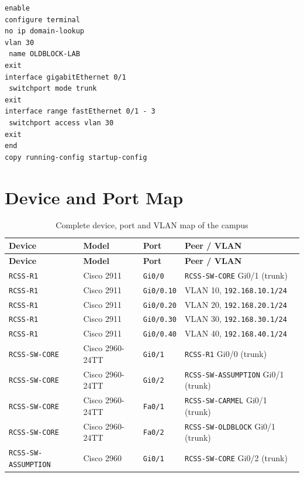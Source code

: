 \documentclass[11pt,a4paper]{article}
\begin{document}
\begin{lstlisting}[caption={Old Block switch \texttt{RCSS-SW-OLDBLOCK}}]
enable
configure terminal
no ip domain-lookup
vlan 30
 name OLDBLOCK-LAB
exit
interface gigabitEthernet 0/1
 switchport mode trunk
exit
interface range fastEthernet 0/1 - 3
 switchport access vlan 30
exit
end
copy running-config startup-config
\end{lstlisting}

\section{Device and Port Map}
\label{app:map}

\small
\begin{longtable}{@{}L{0.24\textwidth} L{0.15\textwidth} L{0.22\textwidth} L{0.29\textwidth}@{}}
\caption{Complete device, port and VLAN map of the campus}\label{tab:map}\\
\toprule
\textbf{Device} & \textbf{Model} & \textbf{Port} & \textbf{Peer / VLAN} \\
\midrule
\endfirsthead
\toprule
\textbf{Device} & \textbf{Model} & \textbf{Port} & \textbf{Peer / VLAN} \\
\midrule
\endhead
\texttt{RCSS-R1}           & Cisco 2911     & \texttt{Gi0/0}    & \texttt{RCSS-SW-CORE} Gi0/1 (trunk) \\
\texttt{RCSS-R1}           & Cisco 2911     & \texttt{Gi0/0.10} & VLAN 10, \texttt{192.168.10.1/24} \\
\texttt{RCSS-R1}           & Cisco 2911     & \texttt{Gi0/0.20} & VLAN 20, \texttt{192.168.20.1/24} \\
\texttt{RCSS-R1}           & Cisco 2911     & \texttt{Gi0/0.30} & VLAN 30, \texttt{192.168.30.1/24} \\
\texttt{RCSS-R1}           & Cisco 2911     & \texttt{Gi0/0.40} & VLAN 40, \texttt{192.168.40.1/24} \\
\texttt{RCSS-SW-CORE}      & Cisco 2960-24TT & \texttt{Gi0/1}    & \texttt{RCSS-R1} Gi0/0 (trunk) \\
\texttt{RCSS-SW-CORE}      & Cisco 2960-24TT & \texttt{Gi0/2}    & \texttt{RCSS-SW-ASSUMPTION} Gi0/1 (trunk) \\
\texttt{RCSS-SW-CORE}      & Cisco 2960-24TT & \texttt{Fa0/1}    & \texttt{RCSS-SW-CARMEL} Gi0/1 (trunk) \\
\texttt{RCSS-SW-CORE}      & Cisco 2960-24TT & \texttt{Fa0/2}    & \texttt{RCSS-SW-OLDBLOCK} Gi0/1 (trunk) \\
\texttt{RCSS-SW-ASSUMPTION} & Cisco 2960    & \texttt{Gi0/1}    & \texttt{RCSS-SW-CORE} Gi0/2 (trunk) \\

\end{longtable}
\end{document}
